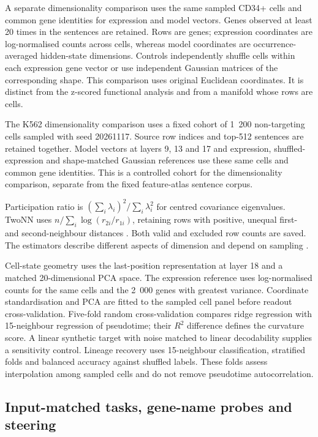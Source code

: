 \documentclass[review,authoryear,12pt]{elsarticle}
\begin{document}
A separate dimensionality comparison uses the same sampled CD34+ cells and common gene identities
for expression and model vectors. Genes observed at least 20 times in the sentences are retained.
Rows are genes; expression coordinates are log-normalised counts across cells, whereas model
coordinates are occurrence-averaged hidden-state dimensions. Controls independently shuffle cells
within each expression gene vector or use independent Gaussian matrices of the corresponding
shape. This comparison uses original Euclidean coordinates. It is distinct from the z-scored
functional analysis and from a manifold whose rows are cells.

The K562 dimensionality comparison uses a fixed cohort of 1~200 non-targeting cells sampled
with seed 20261117. Source row indices and top-512 sentences are retained together. Model
vectors at layers 9, 13 and 17 and expression, shuffled-expression and shape-matched Gaussian
references use these same cells and common gene identities. This is a controlled cohort for
the dimensionality comparison, separate from the fixed feature-atlas sentence corpus.

Participation ratio is $(\sum_i\lambda_i)^2/\sum_i\lambda_i^2$ for centred covariance
eigenvalues. TwoNN uses $n/\sum_i\log(r_{2i}/r_{1i})$, retaining rows with positive, unequal
first- and second-neighbour distances \citep{refTwoNN}. Both valid and excluded row counts are saved.
The estimators describe different aspects of dimension and depend on sampling
\citep{refSingleCellID}.

Cell-state geometry uses the last-position representation at layer 18 and a matched 20-dimensional
PCA space. The expression reference uses log-normalised counts for the same cells and the
2~000 genes with greatest variance. Coordinate standardisation and PCA are fitted to the sampled
cell panel before readout cross-validation. Five-fold random cross-validation compares ridge regression
with 15-neighbour regression of pseudotime; their $R^2$ difference defines the curvature score.
A linear synthetic target with noise matched to linear decodability supplies a sensitivity control.
Lineage recovery uses 15-neighbour classification, stratified folds and balanced accuracy against
shuffled labels. These folds assess interpolation among sampled cells and do not remove pseudotime
autocorrelation.

\subsection{Input-matched tasks, gene-name probes and steering}
\end{document}
